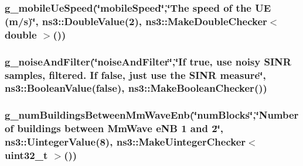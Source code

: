 \subsubsection[{\texorpdfstring{g\+\_\+mobile\+Ue\+Speed}{g_mobileUeSpeed}}]{ g\+\_\+mobile\+Ue\+Speed(\char`\"{}mobile\+Speed\char`\"{},\char`\"{}The {\bf speed} of the UE (m/{\bf s})\char`\"{}, ns3\+::\+Double\+Value(2), {\bf ns3\+::\+Make\+Double\+Checker}$<$ double $>$())\hspace{0.3cm}{\ttfamily [static]}}\hypertarget{mc-twoenbs_8cc_afaf43b629c3b9916254a5c4b25053ea6}{}\label{mc-twoenbs_8cc_afaf43b629c3b9916254a5c4b25053ea6}
\subsubsection[{\texorpdfstring{g\+\_\+noise\+And\+Filter}{g_noiseAndFilter}}]{ g\+\_\+noise\+And\+Filter(\char`\"{}noise\+And\+Filter\char`\"{},\char`\"{}If true, use noisy {\bf S\+I\+NR} samples, filtered. If {\bf false}, just use the {\bf S\+I\+NR} measure\char`\"{}, ns3\+::\+Boolean\+Value({\bf false}), ns3\+::\+Make\+Boolean\+Checker())\hspace{0.3cm}{\ttfamily [static]}}\hypertarget{mc-twoenbs_8cc_a1e5a3eeb671d2cf5388b7f414c4c22e3}{}\label{mc-twoenbs_8cc_a1e5a3eeb671d2cf5388b7f414c4c22e3}
\subsubsection[{\texorpdfstring{g\+\_\+num\+Buildings\+Between\+Mm\+Wave\+Enb}{g_numBuildingsBetweenMmWaveEnb}}]{ g\+\_\+num\+Buildings\+Between\+Mm\+Wave\+Enb(\char`\"{}num\+Blocks\char`\"{},\char`\"{}Number of buildings between Mm\+Wave e\+NB 1 and 2\char`\"{}, ns3\+::\+Uinteger\+Value(8), {\bf ns3\+::\+Make\+Uinteger\+Checker}$<$ uint32\+\_\+t $>$())\hspace{0.3cm}{\ttfamily [static]}}\hypertarget{mc-twoenbs_8cc_a7fe4f592490bff971c7398fd433b5fad}{}\label{mc-twoenbs_8cc_a7fe4f592490bff971c7398fd433b5fad}
